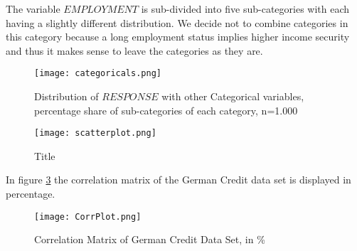 The variable $EMPLOYMENT$ is sub-divided into five sub-categories with each having a slightly different distribution. We decide not to combine categories in this category because a long employment status implies higher income security and thus it makes sense to leave the categories as they are.
\begin{figure}[htbp]
	\centering
	\texttt{[image: categoricals.png]}
	\caption{Distribution of $RESPONSE$ with other Categorical variables, percentage share of sub-categories of each category, n=1.000}
	\label{categoricals}
\end{figure}
\begin{figure}[!]
	\centering
	\texttt{[image: scatterplot.png]}
	\caption{Title}
	\label{scatterplot}
\end{figure}
\newpage
In figure \ref{corrMatrix} the correlation matrix of the German Credit data set is displayed in percentage.
\begin{figure}[!]
	\centering
	\texttt{[image: CorrPlot.png]}
	\caption{Correlation Matrix of German Credit Data Set, in \%}
	\label{corrMatrix}
\end{figure}
